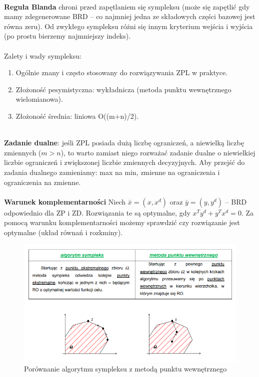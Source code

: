\documentclass[12pt]{article}
\begin{document}
~\\
\textbf{Reguła Blanda} chroni przed zapętlaniem się sympleksu (może się zapętlić gdy mamy zdegenerowane BRD -- co najmniej jedna ze składowych części bazowej jest równa zeru). Od zwykłego sympleksu różni się innym kryterium wejścia i wyjścia (po prostu bierzemy najmniejszy indeks).\\
~\\
Zalety i wady sympleksu:
\begin{enumerate}
	\item Ogólnie znany i często stosowany do rozwiązywania ZPL w praktyce.
	\item Złożoność pesymistyczna: wykładnicza (metoda punktu wewnętrznego wielomianowa).
	\item Złożoność średnia: liniowa O((m+n)/2).
\end{enumerate}
~\\
\textbf{Zadanie dualne}: jeśli ZPL posiada dużą liczbę ograniczeń, a niewielką liczbę zmiennych ($m>n$), to warto zamiast niego rozważać zadanie dualne o niewielkiej liczbie ograniczeń i zwiększonej liczbie zmiennych decyzyjnych. Aby przejść do zadania dualnego zamieniamy: max na min, zmienne na ograniczenia i ograniczenia na zmienne.\\
~\\
\textbf{Warunek komplementarności}
Niech $\bar{x} = (x, x^{d})$ oraz $\bar{y} = (y, y^{d})$ -- BRD odpowiednio dla ZP i ZD. Rozwiązania te są optymalne, gdy $x^{T}y^{d} + y^{T}x^{d} = 0$. Za pomocą warunku komplementarności możemy sprawdzić czy rozwiązanie jest optymalne (układ równań i rozkminy).
\begin{figure}[H]
	\centering
	\includegraphics[scale=0.7]{Pictures/sympleks_metodaPunWew}
	\caption{Porównanie algorytmu sympleksu z metodą punktu wewnętrznego}
\end{figure}
\end{document}
